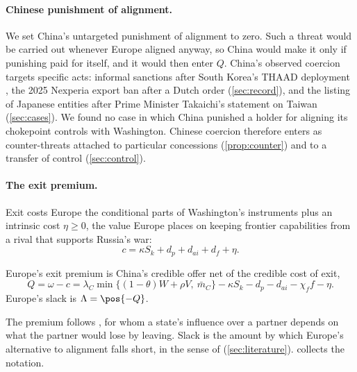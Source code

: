 \paragraph{Chinese punishment of alignment.} We set China's untargeted punishment of alignment to zero. Such a threat would be carried out whenever Europe aligned anyway, so China would make it only if punishing paid for itself, and it would then enter $Q$. China's observed coercion targets specific acts: informal sanctions after South Korea's THAAD deployment \citep{lim2022informal}, the 2025 Nexperia export ban after a Dutch order (\cref{sec:record}), and the listing of Japanese entities after Prime Minister Takaichi's statement on Taiwan (\cref{sec:cases}). We found no case in which China punished a holder for aligning its chokepoint controls with Washington. Chinese coercion therefore enters as counter-threats attached to particular concessions (\cref{prop:counter}) and to a transfer of control (\cref{sec:control}).

\paragraph{The exit premium.} Exit costs Europe the conditional parts of Washington's instruments plus an intrinsic cost $\eta\ge 0$, the value Europe places on keeping frontier capabilities from a rival that supports Russia's war:
\[
c=\kappa S_k+d_p+d_{ai}+d_f+\eta .
\]

\begin{definition}\label{def:Q}
Europe's exit premium is China's credible offer net of the credible cost of exit,
\begin{equation}\label{eq:Q}
Q=\omega-c=\lambda_C\min\{(1-\theta)W+\rho V,\ \bar m_C\}-\kappa S_k-d_p-d_{ai}-\chi_f f-\eta .
\end{equation}
Europe's slack is $\Lambda=\pos{-Q}$.
\end{definition}

The premium follows \citet{hirschman1945national}, for whom a state's influence over a partner depends on what the partner would lose by leaving. Slack is the amount by which Europe's alternative to alignment falls short, in the sense of \citet{clayton2026putting} (\cref{sec:literature}).  collects the notation.

